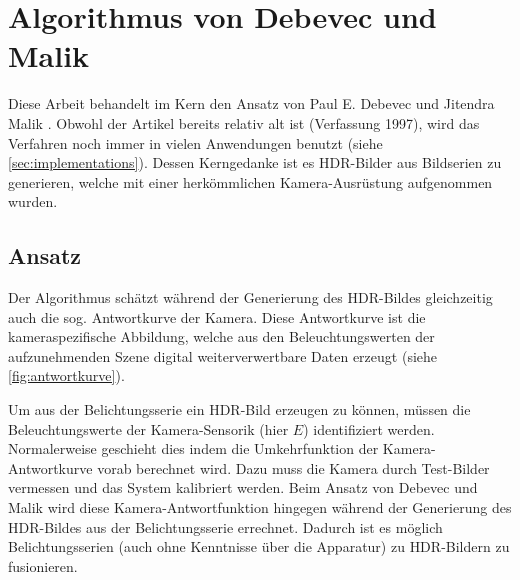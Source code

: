 \chapter{Algorithmus von Debevec und Malik \cite{paper}}
\label{chap:algo}
Diese Arbeit behandelt im Kern den Ansatz von Paul E. Debevec und Jitendra Malik \cite{paper}. Obwohl der Artikel bereits relativ alt ist (Verfassung 1997), wird das Verfahren noch immer in vielen Anwendungen benutzt (siehe \autoref{sec:implementations}). Dessen Kerngedanke ist es \gls{HDR}-Bilder aus Bildserien zu generieren, welche mit einer herkömmlichen Kamera-Ausrüstung aufgenommen wurden.

\section{Ansatz}
Der Algorithmus schätzt während der Generierung des \gls{HDR}-Bildes gleichzeitig auch die sog. Antwortkurve der Kamera. Diese Antwortkurve ist die kameraspezifische Abbildung, welche aus den Beleuchtungswerten der aufzunehmenden Szene digital weiterverwertbare Daten erzeugt (siehe \autoref{fig:antwortkurve}). 

Um aus der Belichtungsserie ein \gls{HDR}-Bild erzeugen zu können, müssen die Beleuchtungswerte der Kamera-Sensorik (hier $E$) identifiziert werden. Normalerweise geschieht dies indem die Umkehrfunktion der Kamera-Antwortkurve vorab berechnet wird. Dazu muss die Kamera durch Test-Bilder vermessen und das System kalibriert werden. Beim Ansatz von Debevec und Malik wird diese Kamera-Antwortfunktion hingegen während der Generierung des \gls{HDR}-Bildes aus der Belichtungsserie errechnet. Dadurch ist es möglich Belichtungsserien (auch ohne Kenntnisse über die Apparatur) zu \gls{HDR}-Bildern zu fusionieren.


